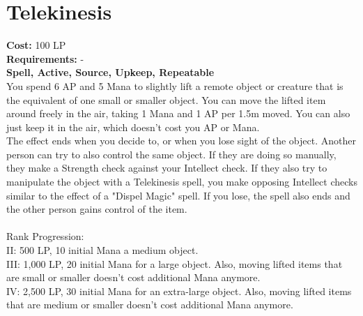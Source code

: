 \section{Telekinesis}\label{spell:telekinesis}
\textbf{Cost:} 100 LP\\
\textbf{Requirements:} -\\
\textbf{Spell, Active, Source, Upkeep, Repeatable}\\
You spend 6 AP and 5 Mana to slightly lift a remote object or creature that is the equivalent of one small or smaller object.
You can move the lifted item around freely in the air, taking 1 Mana and 1 AP per 1.5m moved.
You can also just keep it in the air, which doesn't cost you AP or Mana.\\
The effect ends when you decide to, or when you lose sight of the object.
Another person can try to also control the same object.
If they are doing so manually, they make a Strength check against your Intellect check.
If they also try to manipulate the object with a Telekinesis spell, you make opposing Intellect checks similar to the effect of a "Dispel Magic" spell.
If you lose, the spell also ends and the other person gains control of the item.\\
\\
Rank Progression:\\
II: 500 LP, 10 initial Mana a medium object.\\

III: 1,000 LP, 20 initial Mana for a large object.
Also, moving lifted items that are small or smaller doesn't cost additional Mana anymore.\\

IV: 2,500 LP, 30 initial Mana for an extra-large object.
Also, moving lifted items that are medium or smaller doesn't cost additional Mana anymore.